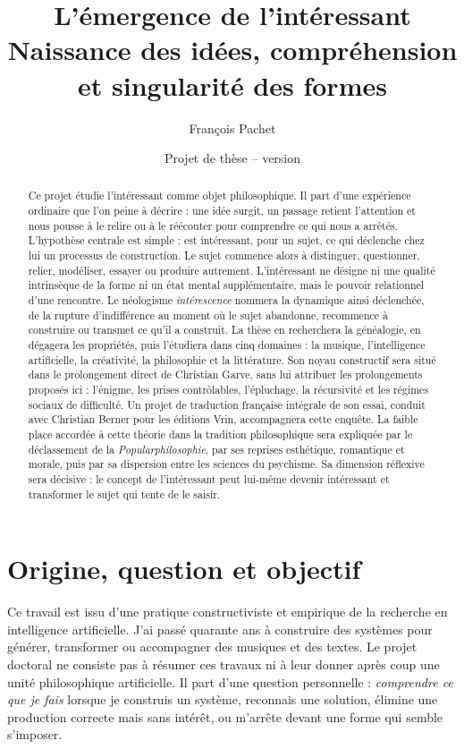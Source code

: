 \documentclass[11pt,a4paper]{article}
\title{L'émergence de l'intéressant\\
\large Naissance des idées, compréhension et singularité des formes}
\author{François Pachet}
\date{Projet de thèse -- version \projectversion\\\small \projectdate}
\begin{document}
\maketitle

\begin{abstract}
Ce projet étudie l'intéressant comme objet philosophique. Il part
d'une expérience ordinaire que l'on peine à décrire : une idée surgit, un
passage retient l'attention et nous pousse à le relire ou à le réécouter pour
comprendre ce qui nous a arrêtés. L'hypothèse centrale est
simple : est intéressant, pour un sujet, ce qui déclenche chez lui un processus
de construction. Le sujet commence alors à
distinguer, questionner, relier, modéliser, essayer ou produire autrement.
L'intéressant ne désigne ni une qualité intrinsèque de la forme ni un état
mental supplémentaire, mais le pouvoir relationnel d'une rencontre. Le
néologisme \emph{intérescence} nommera la dynamique ainsi déclenchée, de la
rupture d'indifférence au moment où le sujet abandonne, recommence à construire
ou transmet ce qu'il a construit. La thèse en recherchera la généalogie, en dégagera les propriétés,
puis l'étudiera dans cinq domaines : la musique,
l'intelligence artificielle, la créativité, la philosophie et la littérature.
Son noyau constructif sera situé dans le prolongement direct de Christian
Garve, sans lui attribuer les prolongements proposés ici : l'énigme, les prises
contrôlables, l'épluchage, la récursivité et les régimes sociaux de difficulté.
Un projet de traduction française intégrale de son essai, conduit avec
Christian Berner pour les éditions Vrin, accompagnera cette enquête.
La faible place accordée à cette théorie dans la tradition philosophique sera
expliquée par le déclassement de la \emph{Popularphilosophie}, par ses reprises
esthétique, romantique et morale, puis par sa dispersion entre les sciences du psychisme.
Sa dimension réflexive sera décisive : le concept de l'intéressant peut
lui-même devenir intéressant et transformer le sujet qui tente de le saisir.
\end{abstract}

\section{Origine, question et objectif}

Ce travail est issu d'une pratique constructiviste et empirique de la recherche
en intelligence artificielle. J'ai passé quarante ans à construire des systèmes
pour générer, transformer ou accompagner des musiques et des textes. Le projet
doctoral ne consiste pas à résumer ces travaux ni à leur donner après coup une
unité philosophique artificielle. Il part d'une question personnelle :
\emph{comprendre ce que je fais} lorsque je construis un système, reconnais une
solution, élimine une production correcte mais sans intérêt, ou m'arrête devant
une forme qui semble s'imposer.
\end{document}
